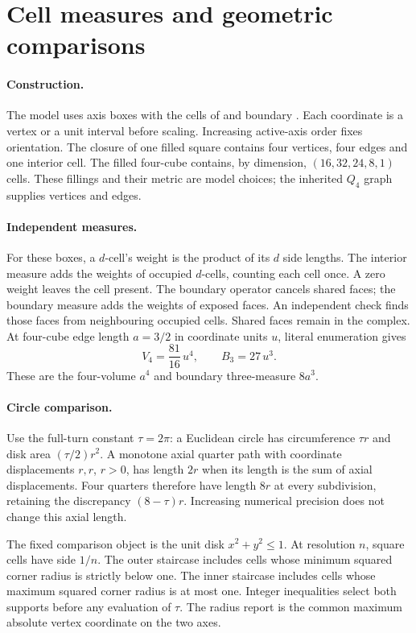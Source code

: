 \section{Cell measures and geometric comparisons}
\label{manual:m3-cells}
\paragraph{Construction.}
The model uses axis boxes with the cells of 
and boundary .
Each coordinate is a vertex or a unit interval before scaling.
Increasing active-axis order fixes orientation.
The closure of one filled square contains four vertices, four
edges and one interior cell. The filled four-cube contains, by dimension,
\((16,32,24,8,1)\) cells. These fillings and their metric are model choices;
the inherited \(Q_4\) graph supplies vertices and edges.

\paragraph{Independent measures.}
For these boxes, a \(d\)-cell's weight is the product of its \(d\) side lengths.
The interior measure adds the weights of occupied \(d\)-cells, counting each
cell once. A zero weight leaves the cell present.
The boundary operator cancels shared faces; the boundary measure adds the
weights of exposed faces. An independent check finds those faces from
neighbouring occupied cells. Shared faces remain in the complex.
At four-cube edge length \(a=3/2\)
in coordinate units \(u\), literal enumeration gives
\[
 V_4=\frac{81}{16}\,u^4,\qquad B_3=27\,u^3.
\]
These are the four-volume \(a^4\) and boundary three-measure \(8a^3\).

\paragraph{Circle comparison.}
\label{prop:m3-staircase}
Use the full-turn constant \(\tau=2\pi\): a Euclidean circle has
circumference \(\tau r\) and disk area \((\tau/2)r^2\).
A monotone axial quarter path with coordinate displacements \(r,r\),
\(r>0\), has length \(2r\) when its length is the sum of axial displacements.
Four quarters therefore have length \(8r\) at every subdivision, retaining
the discrepancy \((8-\tau)r\). Increasing numerical precision does not
change this axial length.

The fixed comparison object is the unit disk \(x^2+y^2\leq1\).
At resolution \(n\), square cells have side \(1/n\).
The outer staircase includes cells whose minimum squared corner radius is
strictly below one. The inner staircase includes cells whose maximum squared
corner radius is at most one. Integer inequalities select both supports before
any evaluation of \(\tau\). The radius report is the common maximum absolute
vertex coordinate on the two axes.

